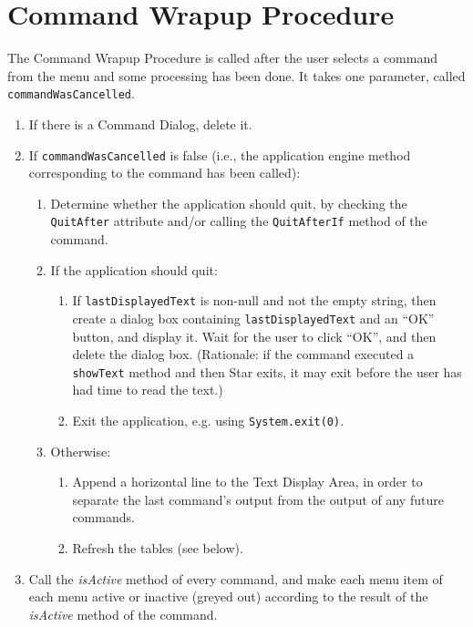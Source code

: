 \documentclass[11pt]{article}
\begin{document}
\section{Command Wrapup Procedure}

The Command Wrapup Procedure is called after the user selects a
command from the menu and some processing has been done.  It takes
one parameter, called {\tt commandWasCancelled}.
\begin{enumerate}
\item If there is a Command Dialog, delete it.
\item If {\tt commandWasCancelled} is false (i.e., the application
  engine method corresponding to the command has been called):
  \begin{enumerate}
  \item Determine whether the application should quit, by checking
    the {\tt QuitAfter} attribute and/or calling the {\tt QuitAfterIf}
    method of the command.
  \item If the application should quit:
    \begin{enumerate}
    \item If {\tt lastDisplayedText} is non-null and not the empty string,
      then create a dialog box containing {\tt lastDisplayedText} and
      an ``OK'' button, and display it.  Wait for the user to
      click ``OK'', and then delete the dialog box.
      (Rationale:  if the command executed a {\tt showText} method and
      then Star exits, it may exit before the user has had time to
      read the text.)
    \item Exit the application, e.g. using {\tt System.exit(0)}.
    \end{enumerate}
  \item Otherwise:
    \begin{enumerate}
    \item Append a horizontal line to the Text Display Area, in order to
      separate the last command's output from the output of any
      future commands.
    \item Refresh the tables (see below).
    \end{enumerate}
  \end{enumerate}
\item Call the {\it isActive} method of every command, and make each
  menu item of each menu active or inactive (greyed out) according to
  the result of the {\it isActive} method of the command.
\end{enumerate}
\end{document}

